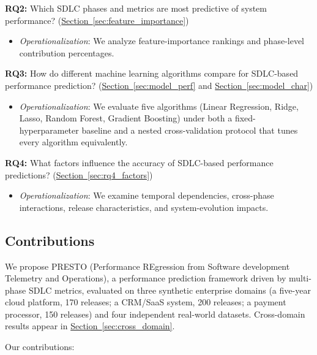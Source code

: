 \documentclass[technologies,article,submit,pdftex,moreauthors]{Definitions/mdpi}
\providecommand{\tightlist}{%
  \setlength{\itemsep}{0pt}\setlength{\parskip}{0pt}}
\begin{document}
\textbf{RQ2:} Which SDLC phases and metrics are most predictive of system performance? (\hyperref[sec:feature_importance]{Section~\ref*{sec:feature_importance}})

\begin{itemize}
\tightlist
\item
  \emph{Operationalization}: We analyze feature-importance rankings and phase-level contribution percentages.
\end{itemize}

\textbf{RQ3:} How do different machine learning algorithms compare for SDLC-based performance prediction? (\hyperref[sec:model_perf]{Section~\ref*{sec:model_perf}} and \hyperref[sec:model_char]{Section~\ref*{sec:model_char}})

\begin{itemize}
\tightlist
\item
  \emph{Operationalization}: We evaluate five algorithms (Linear Regression, Ridge, Lasso, Random Forest, Gradient Boosting) under both a fixed-hyperparameter baseline and a nested cross-validation protocol that tunes every algorithm equivalently.
\end{itemize}

\textbf{RQ4:} What factors influence the accuracy of SDLC-based performance predictions? (\hyperref[sec:rq4_factors]{Section~\ref*{sec:rq4_factors}})

\begin{itemize}
\tightlist
\item
  \emph{Operationalization}: We examine temporal dependencies, cross-phase interactions, release characteristics, and system-evolution impacts.
\end{itemize}

\subsection{Contributions}\label{sec:contributions}

We propose PRESTO (Performance REgression from Software development Telemetry and Operations), a performance prediction framework driven by multi-phase SDLC metrics, evaluated on three synthetic enterprise domains (a five-year cloud platform, 170 releases; a CRM/SaaS system, 200 releases; a payment processor, 150 releases) and four independent real-world datasets. Cross-domain results appear in \hyperref[sec:cross_domain]{Section~\ref*{sec:cross_domain}}.

Our contributions:
\end{document}
